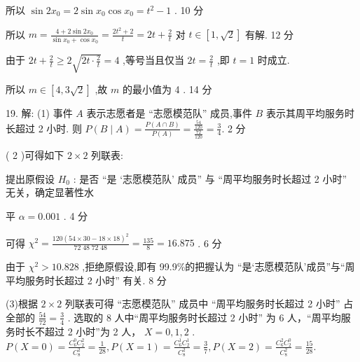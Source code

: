 \documentclass[10pt]{article}
\begin{document}
所以 \(\sin 2{x}_{0} = 2\sin {x}_{0}\cos {x}_{0} = {t}^{2} - 1\) . 10 分

所以 \(m = \frac{4 + 2\sin 2{x}_{0}}{\sin {x}_{0} + \cos {x}_{0}} = \frac{2{t}^{2} + 2}{t} = {2t} + \frac{2}{t}\) 对 \(t \in  \left\lbrack  {1,\sqrt{2}}\right\rbrack\) 有解. 12 分

由于 \({2t} + \frac{2}{t} \geq  2\sqrt{{2t} \cdot  \frac{2}{t}} = 4\) ,等号当且仅当 \({2t} = \frac{2}{t}\) ,即 \(t = 1\) 时成立.

所以 \(m \in  \left\lbrack  {4,3\sqrt{2}}\right\rbrack\) ,故 \(m\) 的最小值为 4 . 14 分

19. 解: (1) 事件 \(A\) 表示志愿者是 “志愿模范队” 成员,事件 \(B\) 表示其周平均服务时长超过 2 小时. 则 \(P\left( {B \mid  A}\right)  = \frac{P\left( {A \cap  B}\right) }{P\left( A\right) } = \frac{\frac{54}{120}}{\frac{72}{120}} = \frac{3}{4}.\) 2 分

( 2 )可得如下 \(2 \times  2\) 列联表:

\begin{center}
\end{center}

提出原假设 \({H}_{0}\) : 是否 “是 ‘志愿模范队’ 成员” 与 “周平均服务时长超过 2 小时” 无关，确定显著性水

平 \(\alpha  = {0.001}\) . 4 分

可得 \({\chi }^{2} = \frac{{120}{\left( {54} \times  {30} - {18} \times  {18}\right) }^{2}}{{72}\;{48}\;{72}\;{48}} = \frac{135}{8} = {16.875}\) . 6 分

由于 \({\chi }^{2} > {10.828}\) ,拒绝原假设,即有 99.9\%的把握认为 “是‘志愿模范队’成员”与“周平均服务时长超过 2 小时” 有关. 8 分

(3)根据 \(2 \times  2\) 列联表可得 “志愿模范队” 成员中 “周平均服务时长超过 2 小时” 占全部的 \(\frac{54}{72} = \frac{3}{4}\) . 选取的 8 人中“周平均服务时长超过 2 小时” 为 6 人，“周平均服务时长不超过 2 小时”为 2 人， \(X = 0,1,2\) . \(P\left( {X = 0}\right)  = \frac{{C}_{6}^{0}{C}_{2}^{2}}{{C}_{8}^{2}} = \frac{1}{28},P\left( {X = 1}\right)  = \frac{{C}_{6}^{1}{C}_{2}^{1}}{{C}_{8}^{2}} = \frac{3}{7},P\left( {X = 2}\right)  = \frac{{C}_{6}^{2}{C}_{2}^{0}}{{C}_{8}^{2}} = \frac{15}{28}.\)
\end{document}
